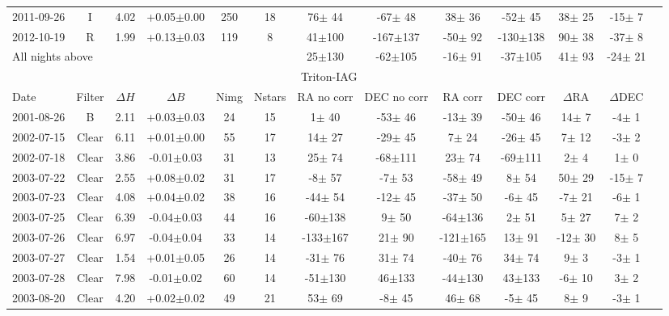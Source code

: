 \documentclass[12pt,a4paper]{report}
\begin{document}
\begin{landscape}
\begin{longtable}{|l|c|c|c|c|c|c|c|c|c|c|c|c|}
2011-09-26 & I     & 4.02 & +0.05$\pm$0.00 & 250 &  18 &   76$\pm$ 44 &  -67$\pm$ 48 &   38$\pm$ 36 &  -52$\pm$ 45 &   38$\pm$ 25 &  -15$\pm$  7 \\ 
2012-10-19 & R     & 1.99 & +0.13$\pm$0.03 & 119 &   8 &   41$\pm$100 & -167$\pm$137 &  -50$\pm$ 92 & -130$\pm$138 &   90$\pm$ 38 &  -37$\pm$  8 \\ 
\hline
\multicolumn{6}{|l|}{All nights above} & 25$\pm$130 &  -62$\pm$105 &  -16$\pm$ 91 &  -37$\pm$105 &   41$\pm$ 93 &  -24$\pm$ 21 \\
\hline
\multicolumn{12}{|c|}{Triton-IAG}\\
Date & Filter & $\Delta H$ & $\Delta B$ & Nimg & Nstars & RA no corr & DEC no corr & RA corr & DEC corr & $\Delta$RA & $\Delta$DEC \\
\hline
2001-08-26 & B     & 2.11 & +0.03$\pm$0.03 &  24 &  15 &    1$\pm$ 40 &  -53$\pm$ 46 &  -13$\pm$ 39 &  -50$\pm$ 46 &   14$\pm$  7 &   -4$\pm$  1 \\ 
2002-07-15 & Clear & 6.11 & +0.01$\pm$0.00 &  55 &  17 &   14$\pm$ 27 &  -29$\pm$ 45 &    7$\pm$ 24 &  -26$\pm$ 45 &    7$\pm$ 12 &   -3$\pm$  2 \\ 
2002-07-18 & Clear & 3.86 & -0.01$\pm$0.03 &  31 &  13 &   25$\pm$ 74 &  -68$\pm$111 &   23$\pm$ 74 &  -69$\pm$111 &    2$\pm$  4 &    1$\pm$  0 \\ 
2003-07-22 & Clear & 2.55 & +0.08$\pm$0.02 &  31 &  17 &   -8$\pm$ 57 &   -7$\pm$ 53 &  -58$\pm$ 49 &    8$\pm$ 54 &   50$\pm$ 29 &  -15$\pm$  7 \\ 
2003-07-23 & Clear & 4.08 & +0.04$\pm$0.02 &  38 &  16 &  -44$\pm$ 54 &  -12$\pm$ 45 &  -37$\pm$ 50 &   -6$\pm$ 45 &   -7$\pm$ 21 &   -6$\pm$  1 \\ 
2003-07-25 & Clear & 6.39 & -0.04$\pm$0.03 &  44 &  16 &  -60$\pm$138 &    9$\pm$ 50 &  -64$\pm$136 &    2$\pm$ 51 &    5$\pm$ 27 &    7$\pm$  2 \\ 
2003-07-26 & Clear & 6.97 & -0.04$\pm$0.04 &  33 &  14 & -133$\pm$167 &   21$\pm$ 90 & -121$\pm$165 &   13$\pm$ 91 &  -12$\pm$ 30 &    8$\pm$  5 \\ 
2003-07-27 & Clear & 1.54 & +0.01$\pm$0.05 &  26 &  14 &  -31$\pm$ 76 &   31$\pm$ 74 &  -40$\pm$ 76 &   34$\pm$ 74 &    9$\pm$  3 &   -3$\pm$  1 \\ 
2003-07-28 & Clear & 7.98 & -0.01$\pm$0.02 &  60 &  14 &  -51$\pm$130 &   46$\pm$133 &  -44$\pm$130 &   43$\pm$133 &   -6$\pm$ 10 &    3$\pm$  2 \\ 
2003-08-20 & Clear & 4.20 & +0.02$\pm$0.02 &  49 &  21 &   53$\pm$ 69 &   -8$\pm$ 45 &   46$\pm$ 68 &   -5$\pm$ 45 &    8$\pm$  9 &   -3$\pm$  1 \\ 

\end{longtable}
\end{landscape}
\end{document}
